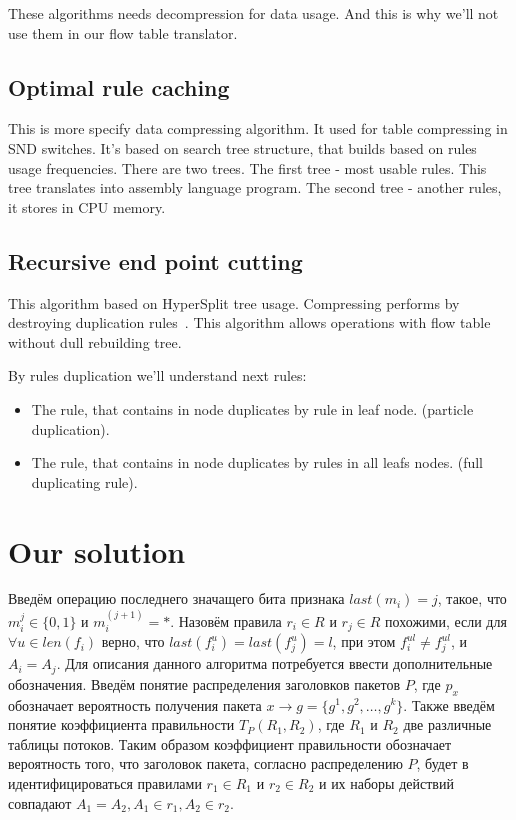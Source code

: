 \documentclass[conference]{IEEEtran}
\begin{document}
            These algorithms needs decompression for data usage. And this is why
            we'll not use them in our flow table translator.
        \subsection{Optimal rule caching}
            This is more specify data compressing algorithm. It used for table compressing in SND switches.
            It's based on search tree structure, that builds based on rules usage frequencies.
            There are two trees. The first tree - most usable rules. This tree translates into assembly
            language program. The second tree - another rules, it stores in CPU memory.
        \subsection{Recursive end point cutting}
            This algorithm based on HyperSplit tree usage. Compressing performs by destroying duplication rules~\cite{chang2019fast}.
            This algorithm allows operations with flow table without dull rebuilding tree.

            By rules duplication we'll understand next rules:
            \begin{itemize}
                \item The rule, that contains in node duplicates by rule in leaf node. (particle duplication).
                \item The rule, that contains in node duplicates by rules in all leafs nodes. (full duplicating rule).
            \end{itemize}
    \section{Our solution}
                Введём операцию последнего значащего бита признака \(last(m_i) = j\), такое, что \(m_i^j \in \{0, 1\}\) и \(m_i^{(j+1)} = *\). 
        Назовём правила \(r_i \in R\) и \(r_j \in R\) похожими, 
        если для \(\forall u \in len(f_i)\) верно, что \(last(f_i^u) = last(f_j^u) = l\), при этом \(f_i^{ul} \neq f_j^{ul}\), и \(A_i = A_j\).
        Для описания данного алгоритма потребуется ввести дополнительные обозначения. Введём понятие распределения заголовков пакетов \(P\),
            где \(p_x\) обозначает вероятность получения пакета \(x \rightarrow g=\{g^1,g^2,\ldots,g^k\}\).
            Также введём понятие коэффициента правильности \(T_P(R_1, R_2)\), где \(R_1\) и \(R_2\) две различные таблицы потоков. 
            Таким образом коэффициент правильности обозначает вероятность того, что заголовок пакета, согласно распределению \(P\),
            будет в идентифицироваться правилами \(r_1 \in R_1\) и \(r_2 \in R_2\) и их наборы действий совпадают \(A_1 = A_2, A_1 \in r_1, A_2 \in r_2\).
            
\end{document}
